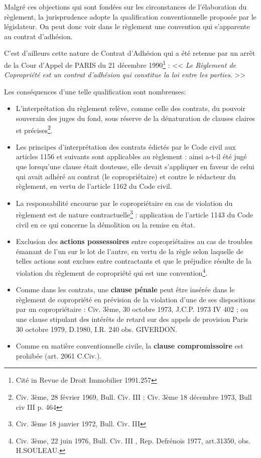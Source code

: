 			Malgré ces objections qui sont fondées sur les circonstances de l'élaboration du règlement, la jurisprudence adopte la qualification conventionnelle proposée par le législateur. On peut donc voir dans le règlement une convention qui s'apparente au contrat d'adhésion.
			
			C'est d'ailleurs cette nature de Contrat d'Adhésion qui a été retenue par un arrêt de la Cour d'Appel de PARIS du 21 décembre 1990\footnote{Cité in Revue de Droit Immobilier 1991.257} : << {\itshape Le Règlement de Copropriété est un contrat d'adhésion qui constitue la loi entre les parties}. >>
			
			Les conséquences d'une telle qualification sont nombreuses:
			\begin{itemize}
				\item L'interprétation du règlement relève, comme celle des contrats, du pouvoir souverain des juges du fond, sous réserve de la dénaturation de clauses claires et précises\footnote{Civ. 3ème, 28 février 1969, Bull. Civ. \no III ; Civ. 3ème 18 décembre 1973, Bull civ III  p. 464}.
				
				\item Les principes d'interprétation des contrats édictés par le Code civil aux articles 1156 et suivants sont applicables au règlement : ainsi a-t-il été jugé que lorsqu'une clause était douteuse, elle devait s'appliquer en faveur de celui qui avait adhéré au contrat (le
				copropriétaire) et contre le rédacteur du règlement, en vertu de l'article 1162 du Code civil.
				
				\item La responsabilité encourue par le copropriétaire en cas de violation du règlement est de nature contractuelle\footnote{ Civ. 3ème 18 janvier 1972, Bull. Civ. III } : application de l'article 1143 du Code civil en ce qui concerne la démolition ou la remise en état.
				
				\item Exclusion des \textbf{actions possessoires} entre copropriétaires au cas de troubles émanant de l'un sur le lot de l'autre, en vertu de la règle selon laquelle de telles actions sont exclues entre contractants et que le préjudice résulte de la violation du règlement de copropriété qui est une convention\footnote{Civ. 3ème, 22 juin 1976, Bull. Civ. III , Rep. Defrénois 1977, art.31350, obs. H.SOULEAU.}.
				
				\item Comme dans les contrats, une \textbf{clause pénale} peut être insérée dans le règlement de copropriété en prévision de la violation d'une de ses dispositions par un copropriétaire : Civ. 3ème, 30 octobre 1973, J.C.P. 1973 IV 402 ; ou une clause stipulant des intérêts de retard sur des appels de provision Paris 30 octobre 1979, D.1980, I.R. 240 obs. GIVERDON.
				
				\item Comme en matière conventionnelle civile, la \textbf{clause compromissoire }est prohibée (art. 2061 C.Civ.).
			\end{itemize}
	
